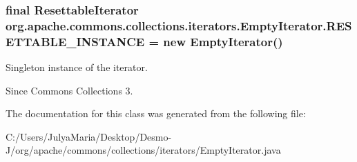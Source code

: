 \subsubsection[{R\-E\-S\-E\-T\-T\-A\-B\-L\-E\-\_\-\-I\-N\-S\-T\-A\-N\-C\-E}]{\setlength{\rightskip}{0pt plus 5cm}final {\bf Resettable\-Iterator} org.\-apache.\-commons.\-collections.\-iterators.\-Empty\-Iterator.\-R\-E\-S\-E\-T\-T\-A\-B\-L\-E\-\_\-\-I\-N\-S\-T\-A\-N\-C\-E = new {\bf Empty\-Iterator}()\hspace{0.3cm}{\ttfamily [static]}}\label{classorg_1_1apache_1_1commons_1_1collections_1_1iterators_1_1_empty_iterator_a35a46f979da62ee8b75b6e4f7c03d025}
Singleton instance of the iterator. \begin{DoxySince}{Since}
Commons Collections 3. 
\end{DoxySince}


The documentation for this class was generated from the following file\-:\begin{DoxyCompactItemize}
\item 
C\-:/\-Users/\-Julya\-Maria/\-Desktop/\-Desmo-\/\-J/org/apache/commons/collections/iterators/Empty\-Iterator.\-java\end{DoxyCompactItemize}
